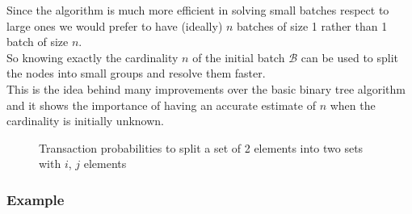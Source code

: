 \documentclass[12pt,a4paper]{report}
\begin{document}
Since the algorithm is much more efficient in solving small batches respect to large ones we would prefer to have (ideally)  $n$ batches of size 1 rather than 1 batch of size $n$.\\
So knowing exactly the cardinality $n$ of the initial batch $\mathcal{B}$ can be used to split the nodes into small groups and resolve them faster. \\This is the idea behind many improvements over the basic binary tree algorithm and it shows the importance of having an accurate estimate of $n$ when the cardinality is initially unknown.

\begin{figure}
\centering
{}
\caption{Transaction probabilities to split a set of 2 elements into two sets with $i$, $j$ elements}
\end{figure}

\subsubsection{Example}
\end{document}
